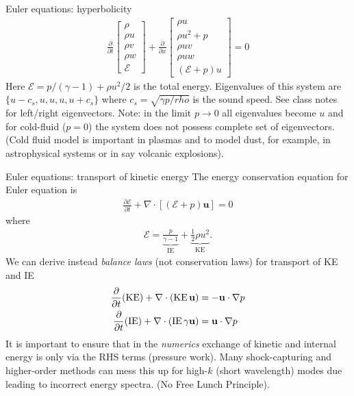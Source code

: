 \documentclass[aspectratio=169]{beamer}
\newcommand{\mypause}{}
\newcommand{\pfrac}[2]{\frac{\partial #1}{\partial #2}}
\newcommand{\pfraca}[1]{\frac{\partial}{\partial #1}}
\newcommand{\mvec}[1]{\mathbf{#1}}
\begin{document}
\begin{frame}{Euler equations: hyperbolicity}
  \begin{align*}
    \frac{\partial}{\partial{t}}    
    \left[
    \begin{matrix}
      \rho \\
      \rho u \\
      \rho v \\
      \rho w \\
      \mathcal{E}
    \end{matrix}
    \right]
    +
    \frac{\partial}{\partial{x}}
    \left[
    \begin{matrix}
      \rho u \\
      \rho u^2 + p \\
      \rho uv \\
      \rho uw \\
      (\mathcal{E}+p)u
    \end{matrix}
    \right]
    =
    0    
  \end{align*}
  Here $\mathcal{E} = p/(\gamma-1) + \rho u^2/2$ is the total
  energy. Eigenvalues of this system are $\{u-c_s,u,u,u,u+c_s \}$
  where $c_s = \sqrt{\gamma p/rho}$ is the sound speed. See class
  notes for left/right eigenvectors.%
  \vskip0.1in%
  Note: in the limit $p\rightarrow 0$ all eigenvalues become $u$ and
  for cold-fluid ($p=0$) the system does not possess complete set of
  eigenvectors. (Cold fluid model is important in plasmas and to model
  dust, for example, in astrophysical systems or in say volcanic
  explosions).
\end{frame}

\begin{frame}{Euler equations: transport of kinetic energy}
  \footnotesize%
  The energy conservation equation for Euler equation is
  \begin{align*}
    \pfrac{\mathcal{E}}{t} + \nabla\cdot\left[(\mathcal{E}+p)\mvec{u} \right] = 0
  \end{align*}
  where
  \begin{align*}
    \mathcal{E} =
    \underbrace{\frac{p}{\gamma-1}}_{\textrm{IE}} +
    \underbrace{\frac{1}{2}\rho u^2}_{\textrm{KE}}
    .
  \end{align*}
  \mypause%
  We can derive instead \emph{balance laws} (not conservation laws)
  for transport of KE and IE
  \begin{align*}
    \pfraca{t}(\textrm{KE})
    +
    \nabla\cdot(\textrm{KE}\thinspace \mvec{u} )
    &=
      -\mvec{u}\cdot\nabla p \\
    \pfraca{t}(\textrm{IE})
    +
    \nabla\cdot(\textrm{IE}\thinspace \gamma\mvec{u} )
    &=
      \mvec{u}\cdot\nabla p    
  \end{align*}
  \mypause%
  It is important to ensure that in the \emph{numerics} exchange of
  kinetic and internal energy is only via the RHS terms (pressure
  work).%
  \vskip0.1in%
  Many shock-capturing and higher-order methods can mess this up for
  high-$k$ (short wavelength) modes due leading to incorrect energy
  spectra. (No Free Lunch Principle).
\end{frame}
\end{document}
